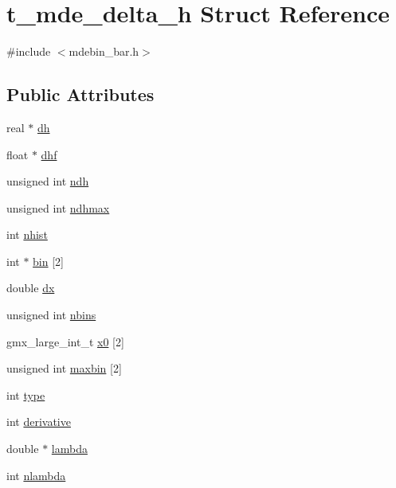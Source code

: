 \hypertarget{structt__mde__delta__h}{\section{t\-\_\-mde\-\_\-delta\-\_\-h \-Struct \-Reference}
\label{structt__mde__delta__h}
}


{\ttfamily \#include $<$mdebin\-\_\-bar.\-h$>$}

\subsection*{\-Public \-Attributes}
\begin{DoxyCompactItemize}
\item 
real $\ast$ \hyperlink{structt__mde__delta__h_a8c16918b4baf8b94184e7c619354be7b}{dh}
\item 
float $\ast$ \hyperlink{structt__mde__delta__h_abc4112eea20d5cef9f2b9ca58e5f0a0c}{dhf}
\item 
unsigned int \hyperlink{structt__mde__delta__h_a5d0ac1a839efb5266e35c303373536c7}{ndh}
\item 
unsigned int \hyperlink{structt__mde__delta__h_a981c318a0ef4e486f26fdef540a4ad92}{ndhmax}
\item 
int \hyperlink{structt__mde__delta__h_a2e5185861c39482c9a899d0852288e1c}{nhist}
\item 
int $\ast$ \hyperlink{structt__mde__delta__h_abf9732bddc23f24a907efa60e5c3ef81}{bin} \mbox{[}2\mbox{]}
\item 
double \hyperlink{structt__mde__delta__h_ac5c954917d1a4a071bf3ebe9d60dc99e}{dx}
\item 
unsigned int \hyperlink{structt__mde__delta__h_a934deffcc7920f89e861d42db4b63c0d}{nbins}
\item 
gmx\-\_\-large\-\_\-int\-\_\-t \hyperlink{structt__mde__delta__h_a57e2a5f530a5623dfdbf071747680d46}{x0} \mbox{[}2\mbox{]}
\item 
unsigned int \hyperlink{structt__mde__delta__h_a367cf281de86a8baebf8da82206c5e09}{maxbin} \mbox{[}2\mbox{]}
\item 
int \hyperlink{structt__mde__delta__h_aba718075a5fb466a306e34c40d9a4bd3}{type}
\item 
int \hyperlink{structt__mde__delta__h_a723d420e53d749b6c1889aa7c5e1d56b}{derivative}
\item 
double $\ast$ \hyperlink{structt__mde__delta__h_ae7afe394676cbc181788d560ba37057b}{lambda}
\item 
int \hyperlink{structt__mde__delta__h_ab83534522d3de935334f617780f954dd}{nlambda}

\end{DoxyCompactItemize}
